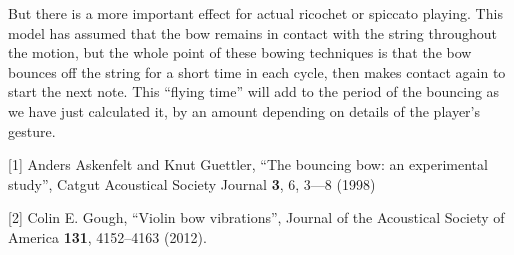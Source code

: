   But there is a more important effect for actual ricochet or spiccato playing. 
  This model has assumed that the bow remains in contact with the string 
  throughout the motion, but the whole point of these bowing techniques is that 
  the bow bounces off the string for a short time in each cycle, then makes 
  contact again to start the next note. This ``flying time'' will add to the 
  period of the bouncing as we have just calculated it, by an amount depending 
  on details of the player's gesture. 

  \sectionreferences{}[1] Anders Askenfelt and Knut Guettler, “The bouncing 
  bow: an experimental study”, Catgut Acoustical Society Journal \textbf{3}, 6, 
  3—8 (1998) 

  [2] Colin E. Gough, ``Violin bow vibrations'', Journal of the Acoustical 
  Society of America \textbf{131}, 4152--4163 (2012). 